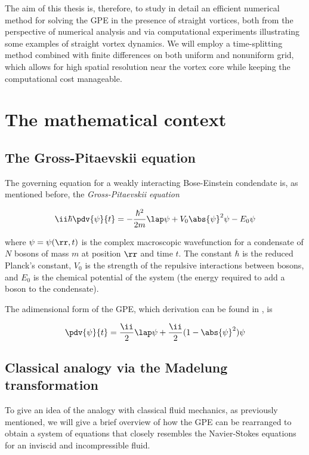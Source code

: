 The aim of this thesis is, therefore, to study in detail an efficient numerical method for solving the GPE in the presence of straight vortices, both from the perspective of numerical analysis and via computational experiments illustrating some examples of straight vortex dynamics. We will employ a time-splitting method combined with finite differences on both uniform and nonuniform grid, which allows for high spatial resolution near the vortex core while keeping the computational cost manageable.

\newpage

\section{The mathematical context}

\subsection{The Gross-Pitaevskii equation}

The governing equation for a weakly interacting Bose-Einstein condendate is, as mentioned before, the \emph{Gross-Pitaevskii equation}

\begin{equation*}
    \ii \hbar \pdv{\psi}{t} = -\frac{\hbar^2}{2m}\lap\psi + V_0\abs{\psi}^2 \psi - E_0 \psi
\end{equation*}

where $\psi = \psi(\rr, t)$ is the complex macroscopic wavefunction for a condensate of $N$ bosons of mass $m$ at position $\rr$ and time $t$. The constant $\hbar$ is the reduced Planck's constant, $V_0$ is the strength of the repulsive interactions between bosons, and $E_0$ is the chemical potential of the system (the energy required to add a boson to the condensate).

The adimensional form of the GPE, which derivation can be found in \cite{CZ12}, is

\begin{equation}
    \pdv{\psi}{t} = \frac\ii2\lap\psi + \frac\ii2 (1 - \abs{\psi}^2)\psi
    \label{eq:gpe}
\end{equation}

\subsection{Classical analogy via the Madelung transformation}

To give an idea of the analogy with classical fluid mechanics, as previously mentioned, we will give a brief overview of how the GPE can be rearranged to obtain a system of equations that closely resembles the Navier-Stokes equations for an inviscid and incompressible fluid.

